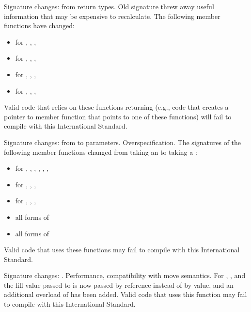 \change
Signature changes: from  return types.
\rationale
Old signature threw away useful information that may be expensive
to recalculate.
\effect
The following member functions have changed:
\begin{itemize}
\item {} for , , , 
\item {} for , , , 
\item {} for , , , 
\item {} for , , , 
\end{itemize}

Valid \CppIII{} code that relies on these functions returning 
(e.g., code that creates a pointer to member function that points to one
of these functions) will fail to compile with this International Standard.

\change
Signature changes: from  to 
parameters.
\rationale
Overspecification.
\effect
The signatures of the following member functions changed from taking an
 to taking a :

\begin{itemize}
\item {} for , , ,
, , , 
\item {} for , , ,
\item {} for , , , 
\item all forms of 
\item all forms of 
\end{itemize}

Valid \CppIII{} code that uses these functions may fail to compile with this
International Standard.

\change
Signature changes: .
\rationale
Performance, compatibility with move semantics.
\effect
For , , and 
the fill value passed to  is now passed by reference instead of
by value, and an additional overload of  has been added. Valid
\CppIII{} code that uses this function may fail to compile with this International
Standard.

